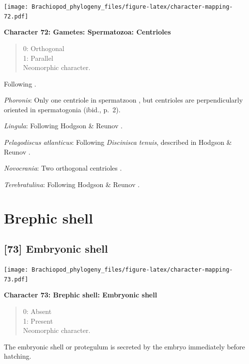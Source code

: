 \documentclass[openany]{book}
\theoremstyle{definition}
\theoremstyle{definition}
\theoremstyle{definition}
\theoremstyle{remark}
\begin{document}
\texttt{[image: Brachiopod\_phylogeny\_files/figure-latex/character-mapping-72.pdf]}

\textbf{Character 72: Gametes: Spermatozoa: Centrioles}

\begin{quote}
0: Orthogonal\\
1: Parallel\\
Neomorphic character.
\end{quote}

Following \citet{Hodgson1994Ultrastructureof}.

\emph{Phoronis}: Only one centriole in spermatzoon
\citep[p.~7]{Reunov2004Ultrastructuralstudy}, but centrioles are
perpendicularly oriented in spermatogonia (ibid., p.~2).

\emph{Lingula}: Following Hodgson \& Reunov
\citeyearpar{Hodgson1994Ultrastructureof}.

\emph{Pelagodiscus atlanticus}: Following \emph{Discinisca}
\emph{tenuis}, described in Hodgson \& Reunov
\citeyearpar{Hodgson1994Ultrastructureof}.

\emph{Novocrania}: Two orthogonal centrioles
\citep{Afzelius1978Finestructure}.

\emph{Terebratulina}: Following Hodgson \& Reunov
\citeyearpar{Hodgson1994Ultrastructureof}.

\hypertarget{brephic-shell}{%
\section{Brephic shell}\label{brephic-shell}}

\hypertarget{embryonic-shell}{%
\subsection*{{[}73{]} Embryonic shell}\label{embryonic-shell}}

\texttt{[image: Brachiopod\_phylogeny\_files/figure-latex/character-mapping-73.pdf]}

\textbf{Character 73: Brephic shell: Embryonic shell}

\begin{quote}
0: Absent\\
1: Present\\
Neomorphic character.
\end{quote}

The embryonic shell or protegulum is secreted by the embryo immediately
before hatching.
\end{document}
